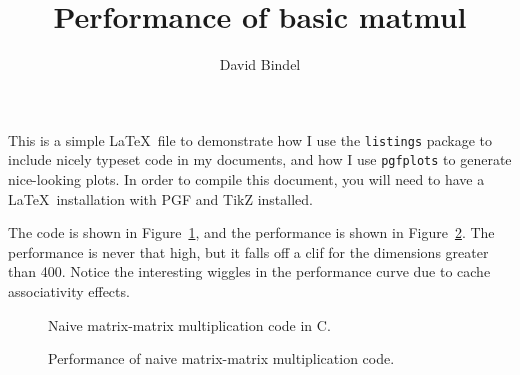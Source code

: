 \documentclass[11pt,leqno]{article}
\title{Performance of basic matmul}
\author{David Bindel}
\begin{document}
\pagestyle{fancy}
\fancyfoot{}

\maketitle

This is a simple \LaTeX\ file to demonstrate how I use the
{\tt listings} package to include nicely typeset code in my documents,
and how I use {\tt pgfplots} to generate nice-looking plots.
In order to compile this document, you will need to have a \LaTeX\ 
installation with PGF and TikZ installed.

The code is shown in Figure~\ref{fig-naive-matmul}, and the performance
is shown in Figure~\ref{fig-naive-perf}.  The performance is never that
high, but it falls off a clif for the dimensions greater than 400.
Notice the interesting wiggles in the performance curve due to cache
associativity effects.

\begin{figure}
\lstset{language=c,frame=lines,columns=flexible}

\caption{Naive matrix-matrix multiplication code in C.}
\label{fig-naive-matmul}
\end{figure}

\begin{figure}
\caption{Performance of naive matrix-matrix multiplication code.}
\label{fig-naive-perf}
\end{figure}
\end{document}
